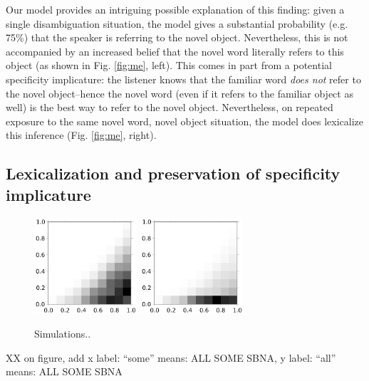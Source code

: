 \documentclass{article} %
\begin{document}
Our model provides an intriguing possible explanation of this finding: given a single disambiguation situation, the model gives a substantial probability (e.g. 75\%) that the speaker is referring to the novel object. Nevertheless, this is not accompanied by an increased belief that the novel word literally refers to this object (as shown in Fig. \ref{fig:me}, left). This comes in part from a potential specificity implicature: the listener knows that the familiar word \emph{does not} refer to the novel object--hence the novel word (even if it refers to the familiar object as well) is the best way to refer to the novel object. Nevertheless, on repeated exposure to the same novel word, novel object situation, the model does lexicalize this inference (Fig. \ref{fig:me}, right).


\subsection{Lexicalization and preservation of specificity implicature}
\label{sec:learning-specificity-implic}

\begin{figure}
\centering
\includegraphics[width=1.5in]{figures/some-all-only-pragmatic.pdf}
\includegraphics[width=1.5in]{figures/some-all-pragmatic+unambiguous.pdf}
\caption{\label{fig:scalar} Simulations..}
\end{figure}

XX on figure, add x label: ``some'' means: ALL   SOME   SBNA, y label: ``all'' means: ALL  SOME  SBNA
\end{document}
